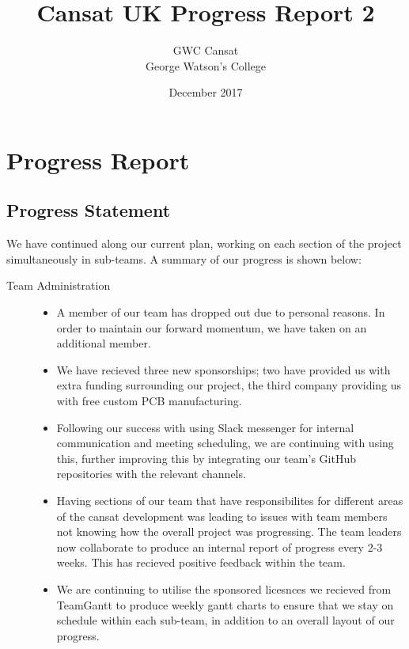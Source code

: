 \documentclass{report}
\title{\bf Cansat UK Progress Report 2}
\author{
	GWC Cansat\\
	George Watson's College	
}
\date{December 2017}
\begin{document}
\maketitle
\tableofcontents
{}

\chapter{Progress Report}
	\section{Progress Statement}
	We have continued along our current plan, working on each 
	section of the project simultaneously in sub-teams. A summary 
	of our progress is shown below:

	\begin{description}
		\item[Team Administration] \hfill \begin{itemize}
			\item A member of our team has dropped out due to personal
			reasons. In order to maintain our forward momentum, we
			have taken on an additional member.
			\item We have recieved three new sponsorships; two have 
			provided us with extra funding surrounding our project,
			the third company providing us with free custom PCB 
			manufacturing.
			\item Following our success with using Slack messenger for 
			internal communication and meeting scheduling,
			we are continuing with using this, further improving this
			by integrating our team's GitHub repositories with the relevant
			channels.
			\item Having sections of our team that have responsibilites for
			different	areas of the cansat development was leading to issues
			with team members not knowing how the overall	project was 
			progressing. The team leaders now collaborate to produce an
			internal report of progress every 2-3 weeks. This has recieved
			positive feedback within the team.
			\item We are continuing to utilise the sponsored licesnces we 
			recieved from TeamGantt to produce weekly gantt charts
			to ensure that we stay on schedule within each sub-team, in
			addition to an overall layout of our progress.
		\end{itemize}
		

\end{description}
\end{document}
